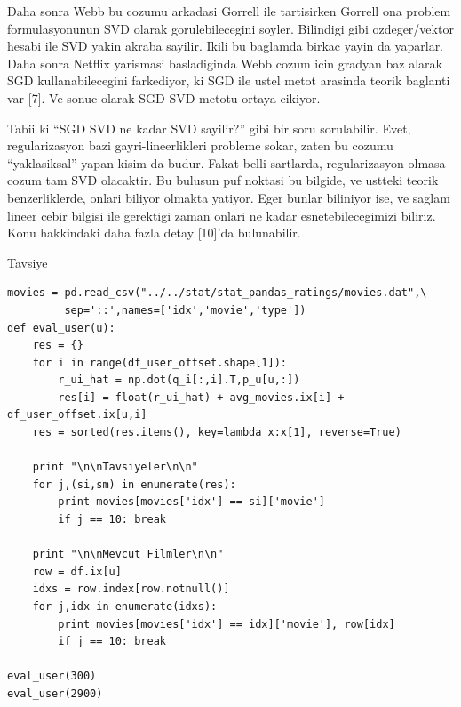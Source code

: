 \documentclass[12pt,fleqn]{article}\usepackage{../common}
\begin{document}
Daha sonra Webb bu cozumu arkadasi Gorrell ile tartisirken Gorrell ona
problem formulasyonunun SVD olarak gorulebilecegini soyler. Bilindigi gibi
ozdeger/vektor hesabi ile SVD yakin akraba sayilir. Ikili bu baglamda
birkac yayin da yaparlar. Daha sonra Netflix yarismasi basladiginda Webb
cozum icin gradyan baz alarak SGD kullanabilecegini farkediyor, ki SGD ile
ustel metot arasinda teorik baglanti var [7]. Ve sonuc olarak SGD SVD
metotu ortaya cikiyor.

Tabii ki ``SGD SVD ne kadar SVD sayilir?'' gibi bir soru sorulabilir. Evet,
regularizasyon bazi gayri-lineerlikleri probleme sokar, zaten bu cozumu
``yaklasiksal'' yapan kisim da budur. Fakat belli sartlarda, regularizasyon
olmasa cozum tam SVD olacaktir. Bu bulusun puf noktasi bu bilgide, ve
ustteki teorik benzerliklerde, onlari biliyor olmakta yatiyor. Eger bunlar
biliniyor ise, ve saglam lineer cebir bilgisi ile gerektigi zaman onlari ne
kadar esnetebilecegimizi biliriz. Konu hakkindaki daha fazla detay [10]'da
bulunabilir.

Tavsiye

\begin{verbatim}
movies = pd.read_csv("../../stat/stat_pandas_ratings/movies.dat",\
         sep='::',names=['idx','movie','type'])
def eval_user(u):
    res = {}
    for i in range(df_user_offset.shape[1]):
        r_ui_hat = np.dot(q_i[:,i].T,p_u[u,:])
        res[i] = float(r_ui_hat) + avg_movies.ix[i] + df_user_offset.ix[u,i]
    res = sorted(res.items(), key=lambda x:x[1], reverse=True)

    print "\n\nTavsiyeler\n\n"
    for j,(si,sm) in enumerate(res):
        print movies[movies['idx'] == si]['movie']
        if j == 10: break

    print "\n\nMevcut Filmler\n\n"
    row = df.ix[u]
    idxs = row.index[row.notnull()]
    for j,idx in enumerate(idxs):
        print movies[movies['idx'] == idx]['movie'], row[idx]
        if j == 10: break

eval_user(300)
eval_user(2900)
\end{verbatim}
\end{document}
